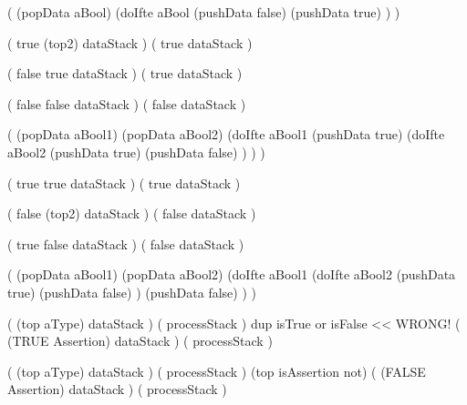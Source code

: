 \startImplementation[ansic]
  (
    (popData aBool)
    (doIfte aBool
      (pushData false)
      (pushData true)
    )
  )
\stopImplementation
\stopJoyLoLWord

\startJoyLoLWord[or]
\startRule[or-true1]
\preDataStack
  (
    true
    (top2)
    dataStack
  )
\postDataStack
  (
    true
    dataStack
  )
\stopRule

\startRule[or-true2]
\preDataStack
  (
    false
    true
    dataStack
  )
\postDataStack
  (
    true
    dataStack
  )
\stopRule

\startRule[or-false]
\preDataStack
  (
    false
    false
    dataStack
  )
\postDataStack
  (
    false
    dataStack
  )
\stopRule

\startImplementation[ansic]
  (
    (popData aBool1)
    (popData aBool2)
    (doIfte aBool1
      (pushData true)
      (doIfte aBool2
        (pushData true)
        (pushData false)
      )
    )
  )
\stopImplementation

\stopJoyLoLWord

\startJoyLoLWord[and]

\preDataStack
  (
    true
    true
    dataStack
  )
\postDataStack
  (
    true
    dataStack
  )
\stopRule

\preDataStack
  (
    false
    (top2)
    dataStack
  )
\postDataStack
  (
    false
    dataStack
  )
\stopRule

\preDataStack
  (
    true
    false
    dataStack
  )
\postDataStack
  (
    false
    dataStack
  )
\stopRule

\startImplementation[ansic]
  (
    (popData aBool1)
    (popData aBool2)
    (doIfte aBool1
      (doIfte aBool2
        (pushData true)
        (pushData false)
      )
      (pushData false)
    )
  )
\stopImplementation

\stopJoyLoLWord

\startJoyLoLWord[isAssertion]

\preDataStack
  (
    (top aType)
    dataStack
  )
\preProcessStack
  (
    processStack
  )
\preCondition
  dup isTrue or isFalse  << WRONG!
\postDataStack
  (
    (TRUE Assertion)
    dataStack
  )
\postProcessStack
  (
    processStack
  )
\stopRule

\preDataStack
  (
    (top aType)
    dataStack
  )
\preProcessStack
  (
    processStack
  )
\preCondition
  (top isAssertion not)
\postDataStack
  (
    (FALSE Assertion)
    dataStack
  )
\postProcessStack
  (
    processStack
  )
\stopRule

